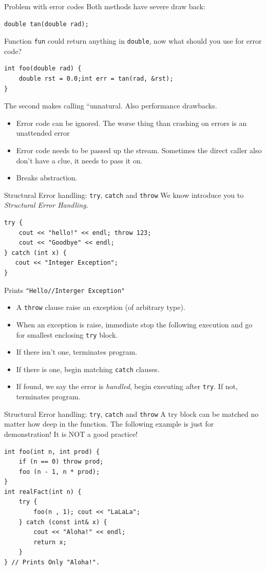 \begin{frame}[fragile]{Problem with error codes}
Both methods have severe draw back:
\begin{verbatim}
double tan(double rad);
\end{verbatim}
Function \texttt{fun} could return anything in \texttt{double}, now what should you use for error code?
\begin{verbatim}
int foo(double rad) {
    double rst = 0.0;int err = tan(rad, &rst);
}
\end{verbatim}
The second makes calling ``unnatural. Also performance drawbacks. 
\begin{itemize}
	\item Error code can be ignored. The worse thing than crashing on errors is an unattended error
	\item Error code needs to be passed up the stream. Sometimes the direct caller also don't have a clue, it needs to pass it on. 
	\item Breaks abstraction.
\end{itemize}
\end{frame}

\begin{frame}[fragile]{Structural Error handling: \texttt{try}, \texttt{catch} and \texttt{throw}}
We know introduce you to \textit{Structural Error Handling}. 
\begin{verbatim}
try {
    cout << "hello!" << endl; throw 123;
    cout << "Goodbye" << endl;
} catch (int x) {
   cout << "Integer Exception";
}
\end{verbatim}
Prints \texttt{"Hello//Interger Exception"}
\begin{itemize}
	\item A \texttt{throw} clause raise an exception (of arbitrary type).
	\item When an exception is raise, immediate stop the following execution and go for smallest enclosing \texttt{try} block.
	\item If there isn't one, terminates program.
	\item If there is one, begin matching \texttt{catch} clauses.
	\item If found, we say the error is \textit{handled}, begin executing after \texttt{try}. If not, terminates program.
\end{itemize}
\end{frame}

\begin{frame}[fragile]{Structural Error handling: \texttt{try}, \texttt{catch} and \texttt{throw}}
A try block can be matched no matter how deep in the function. The following example is just for demonstration! \alert{It is NOT a good practice!}
\begin{verbatim}
int foo(int n, int prod) {
    if (n == 0) throw prod;
    foo (n - 1, n * prod);
}
int realFact(int n) {
    try {
        foo(n , 1); cout << "LaLaLa";
    } catch (const int& x) {
        cout << "Aloha!" << endl;
        return x;
    }
} // Prints Only "Aloha!".
\end{verbatim}

\end{frame}

